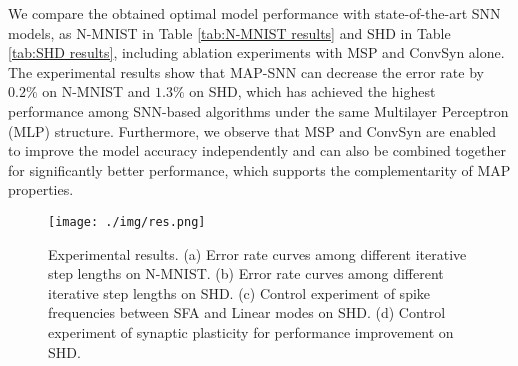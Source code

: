 \documentclass{article}
\begin{document}
\begin{table}
\centering
{}
\caption{Performance of different algorithms on SHD.}
\label{tab:SHD results}
\end{table}
We compare the obtained optimal model performance with state-of-the-art SNN models, as N-MNIST in Table \ref{tab:N-MNIST results} and SHD in Table \ref{tab:SHD results}, including ablation experiments with MSP and ConvSyn alone. The experimental results show that MAP-SNN can decrease the error rate by $0.2\%$ on N-MNIST and $1.3\%$ on SHD, which has achieved the highest performance among SNN-based algorithms under the same Multilayer Perceptron (MLP) structure. Furthermore, we observe that MSP and ConvSyn are enabled to improve the model accuracy independently and can also be combined together for significantly better performance, which supports the complementarity of MAP properties.

\begin{figure*}[htbp]
    \centering
    \texttt{[image: ./img/res.png]}
    \caption{Experimental results. (a) Error rate curves among different iterative step lengths on N-MNIST. (b) Error rate curves among different iterative step lengths on SHD. (c) Control experiment of spike frequencies between SFA and Linear modes on SHD. (d) Control experiment of synaptic plasticity for performance improvement on SHD.}
    \label{fig:results}
\end{figure*}
\end{document}
